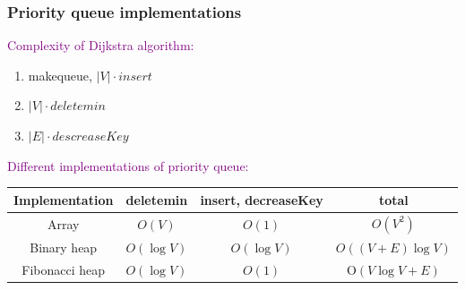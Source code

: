 \begin{frame}
  \frametitle{Priority queue implementations}

  \textcolor{purple}{Complexity of Dijkstra algorithm:}
  \begin{enumerate}
    \item makequeue, $\lvert V \rvert \cdot insert$
    \item $\lvert V \rvert \cdot deletemin$
    \item $\lvert E \rvert \cdot descreaseKey$
  \end{enumerate}

  \pause
  \vspace{0.50cm}

  \textcolor{purple}{Different implementations of priority queue:}

  {\scriptsize

    \begin{tabular}{|c||c|c|c|}
      \hline
      Implementation     & deletemin        & insert, decreaseKey       & total                 \\ \hline \hline
      Array              & $O(V)$           & $O(1)$                    & $O(V^2)$              \\ \hline
      Binary heap        & $O(\log{V})$     & $O(\log{V})$              & $O((V+E) \log {V})$   \\ \hline
      Fibonacci heap     & $O(\log{V})$     & $O(1)$                    & O$(V \log {V} + E)$   \\
      \hline
    \end{tabular}
  }

\end{frame}


